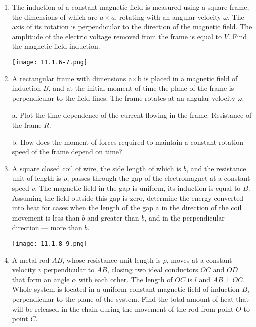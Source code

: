 \documentclass{article}
\begin{document}
\begin{enumerate}[label=11.1.\arabic*]
\item The induction of a constant magnetic field is measured using a square frame, the dimensions of which are $a \times a$, rotating with an angular velocity $\omega$. The axis of its rotation is perpendicular to the direction of the magnetic field. The amplitude of the electric voltage removed from the frame is equal to $V$. Find the magnetic field induction.

\begin{center}
    \texttt{[image: 11.1.6-7.png]}
\end{center}

\item A rectangular frame with dimensions a×b is placed in a magnetic field of induction $B$, and at the initial moment of time the plane of the frame is perpendicular to the field lines. The frame rotates at an angular velocity $\omega$.

a. Plot the time dependence of the current flowing in the frame. Resistance of the frame $R$.

b. How does the moment of forces required to maintain a constant rotation speed of the frame depend on time?

\item A square closed coil of wire, the side length of which is $b$, and the resistance unit of length is $\rho$, passes through the gap of the electromagnet at a constant speed $v$. The magnetic field in the gap is uniform, its induction is equal to $B$. Assuming the field outside this gap is zero, determine the energy converted into heat for cases when the length of the gap a in the direction of the coil movement is less than $b$ and greater than $b$, and in the perpendicular direction — more than $b$.

\begin{center}
    \texttt{[image: 11.1.8-9.png]}
\end{center}

\item A metal rod $AB$, whose resistance unit length is $\rho$, moves at a constant velocity $v$ perpendicular to $AB$, closing two ideal conductors $OC$ and $OD$ that form an angle $\alpha$ with each other. The length of $OC$ is $l$ and $AB \perp OC$. Whole system is located in a uniform constant magnetic field of induction $B$, perpendicular to the plane of the system. Find the total amount of heat that will be released in the chain during the movement of the rod from point $O$ to point $C$.


\end{enumerate}
\end{document}
